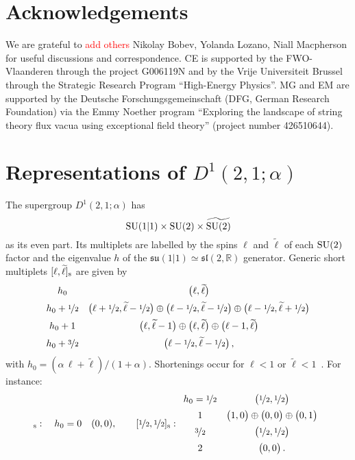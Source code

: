 \documentclass[a4paper, 11pt]{article}
\numberwithin{equation}{section}
\newcommand{\ts}[1]{\widetilde{#1}}
\newcommand{\+}{\oplus}
\newcommand{\EM}[1]{\textcolor{red}{#1}}
\begin{document}
\section*{Acknowledgements}
We are grateful to \EM{add others} Nikolay Bobev, Yolanda Lozano, Niall Macpherson for useful discussions and correspondence. CE is supported by the FWO-Vlaanderen through the project G006119N and by the Vrije Universiteit Brussel through the Strategic Research Program ``High-Energy Physics''. MG and EM are supported by the Deutsche Forschungsgemeinschaft (DFG, German Research Foundation) via the Emmy Noether program ``Exploring the landscape of string theory flux vacua using exceptional field theory'' (project number 426510644).

\appendix

\section{Representations of \texorpdfstring{$D^{1}(2,1;\alpha)$}{D(2,1,a)}} \label{app:d21a}
The supergroup $D^{1}(2,1;\alpha)$ has
\begin{equation}
	{\rm SU}(1\vert1)\times{\rm SU}(2)\times\ts{{\rm SU}(2)}
\end{equation}
as its even part. Its multiplets are labelled by the spins $\ell$ and $\ts{\ell}$ of each ${\rm SU}(2)$ factor and the eigenvalue $h$ of the $\mathfrak{su}(1\vert1)\simeq\mathfrak{sl}(2,\mathbb{R})$ generator. Generic short multiplets $[\ell,\ts{\ell}]_{\rm s}$ are given by~\cite{deBoer:1999gea,Eberhardt:2017fsi}
\begin{equation}
	\begin{array}{cc}
	 h_{0} & \big(\ell,\ts{\ell}\big) \\[5pt]
	 h_{0} + \nicefrac{1}{2} & \big(\ell+\nicefrac{1}{2},\ts{\ell}-\nicefrac{1}{2}\big) \oplus \big(\ell-\nicefrac{1}{2},\ts{\ell}-\nicefrac{1}{2}\big) \oplus \big(\ell-\nicefrac{1}{2},\ts{\ell}+\nicefrac{1}{2}\big) \\[5pt]
	 h_{0}+1 & \big(\ell,\ts{\ell}-1\big) \oplus \big(\ell,\ts{\ell}\big) \oplus \big(\ell-1,\ts{\ell}\big) \\[5pt]
	 h_{0} + \nicefrac{3}{2} & \big(\ell-\nicefrac{1}{2},\ts{\ell}-\nicefrac{1}{2}\big)\,,
	\end{array}
\end{equation}
with $h_{0}=(\alpha\,\ell+\ts{\ell})/(1+\alpha)$. Shortenings occur for $\ell<1$ or $\ts{\ell}<1$~\cite{deBoer:1999gea}. For instance:
\begin{equation}
	[0,0]_{\rm s}:\quad h_{0}=0 \quad (0,0),\qquad  [\nicefrac{1}{2},\nicefrac{1}{2}]_{\rm s}: \begin{array}{cc}
	 h_{0}=\nicefrac{1}{2} & \big(\nicefrac{1}{2},\nicefrac{1}{2}\big) \\[5pt]
	 1 & \big(1,0\big) \oplus \big(0,0\big) \oplus \big(0,1\big) \\[5pt]
	 \nicefrac{3}{2} & \big(\nicefrac{1}{2},\nicefrac{1}{2}\big) \\[5pt]
	 2 & \big(0,0\big)\,.
	\end{array}
\end{equation}
\end{document}
